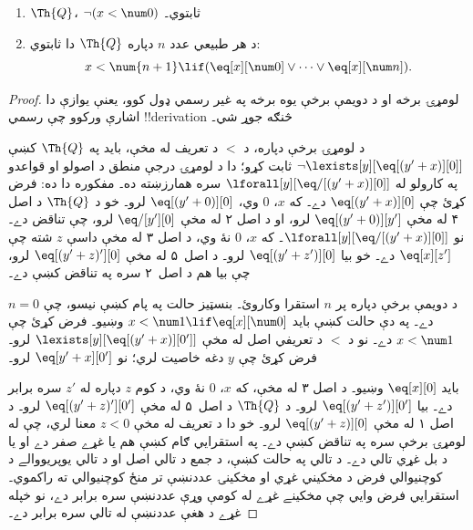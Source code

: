 \documentclass[../../../include/open-logic-section]{subfiles}
\begin{document}
\begin{lem}
\begin{enumerate}
\item $\Th{Q}$، $\lnot (x < \num 0)$ ثابتوي۔
\item د هر طبيعي عدد $n$ دپاره $\Th{Q}$ دا ثابتوي:
\[
x < \num {n+1} \lif (\eq[x][\num 0] \lor \dots \lor \eq[x][\num n]).
\]
\end{enumerate}
\end{lem}

\begin{proof}
لومړۍ برخه او د دويمې برخې يوه برخه په غير رسمي ډول کوو، يعنې يوازې دا اشارې ورکوو چې رسمي !!{derivation} څنګه جوړ شي۔

د لومړۍ برخې دپاره، د $<$ د تعريف له مخې، بايد په $\Th{Q}$ کښې $\lnot \lexists[y][\eq[(y'+x)][0]]$ ثابت کړو؛ دا د لومړۍ درجې منطق د اصولو او قواعدو په کارولو له $\lforall[y][\eq/[(y' + x)][0]]$ سره همارزښته ده۔ مفکوره دا ده: فرض کړئ چې $\eq[(y'+x)][0]$ دے۔ که $x$، 0 وي، $\eq[(y' + 0)][0]$ لرو۔ خو د $\Th{Q}$ د اصل ۴ له مخې $\eq[(y' + 0)][y']$ لرو، او د اصل ۲ له مخې $\eq/[y'][0]$ لرو، چې تناقض دے۔ نو $\lforall[y][\eq/[(y' +x)][0]]$۔ که $x$، $0$ نۀ وي، د اصل ۳ له مخې داسې $z$ شته چې $\eq[x][z']$ دے۔ خو بيا $\eq[(y' + z')][0]$ لرو۔ د اصل~۵ له مخې $\eq[(y' + z)'][0]$ لرو، چې بيا هم د اصل~۲ سره په تناقض کښې دے۔

د دويمې برخې دپاره پر $n$ استقرا وکاروئ۔ بنسټيز حالت په پام کښې نيسو، چې $n =0$ دے۔ په دې حالت کښې بايد $x < \num 1 \lif \eq[x][\num 0]$ وښيو۔ فرض کړئ چې $x < \num 1$ دے۔ نو د $<$ د تعريفي اصل له مخې $\lexists[y][\eq[(y'+x)][0']]$ لرو۔ فرض کړئ چې $y$ دغه خاصيت لري؛ نو $\eq[y'+x][0']$ لرو۔

بايد $\eq[x][0]$ وښيو۔ د اصل ۳ له مخې، که $x$، 0 نۀ وي، د کوم $z$ دپاره له $z'$ سره برابر دے۔ بيا $\eq[(y' + z')][0']$ لرو۔ د $\Th{Q}$ د اصل~۵ له مخې $\eq[(y'+z)'][0']$ لرو۔ د اصل ۱ له مخې $\eq[(y' + z)][0]$ لرو۔ خو دا د تعريف له مخې $z < 0$ معنا لري، چې له لومړۍ برخې سره په تناقض کښې دے۔ په استقرايي ګام کښې هم يا غړے صفر دے او يا د بل غړي تالي دے۔ د تالي په حالت کښې، د جمع د تالي اصل او د تالي يوپر‌يووالے د کوچنيوالي فرض د مخکيني غړي او مخکينۍ عددنښې تر منځ کوچنيوالي ته راکموي۔ استقرايي فرض وايي چې مخکينے غړے له کومې وړې عددنښې سره برابر دے، نو خپله غړے د هغې عددنښې له تالي سره برابر دے۔
\end{proof}
\end{document}
